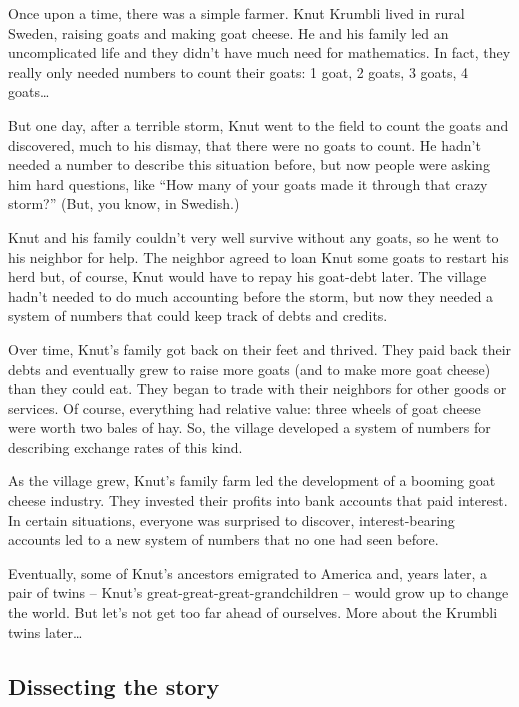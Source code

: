 \begin{story}
Once upon a time, there was a simple farmer. Knut Krumbli lived in rural Sweden, raising goats and making goat cheese. He and his family led an uncomplicated life and they didn't have much need for mathematics. In fact, they really only needed numbers to count their goats: 1 goat, 2 goats, 3 goats, 4 goats\ldots

But one day, after a terrible storm, Knut went to the field to count the goats and discovered, much to his dismay, that there were no goats to count. He hadn't needed a number to describe this situation before, but now people were asking him hard questions, like ``How many of your goats made it through that crazy storm?'' (But, you know, in Swedish.)

Knut and his family couldn't very well survive without any goats, so he went to his neighbor for help. The neighbor agreed to loan Knut some goats to restart his herd but, of course, Knut would have to repay his goat-debt later. The village hadn't needed to do much accounting before the storm, but now they needed a system of numbers that could keep track of debts and credits.

Over time, Knut's family got back on their feet and thrived. They paid back their debts and eventually grew to raise more goats (and to make more goat cheese) than they could eat. They began to trade with their neighbors for other goods or services. Of course, everything had relative value: three wheels of goat cheese were worth two bales of hay. So, the village developed a system of numbers for describing exchange rates of this kind.

As the village grew, Knut's family farm led the development of a booming goat cheese industry. They invested their profits into bank accounts that paid interest. In certain situations, everyone was surprised to discover, interest-bearing accounts led to a new system of numbers that no one had seen before.

Eventually, some of Knut's ancestors emigrated to America and, years later, a pair of twins -- Knut's great-great-great-grandchildren -- would grow up to change the world. But let's not get too far ahead of ourselves. More about the Krumbli twins later\ldots
\end{story}

\subsection{Dissecting the story}

